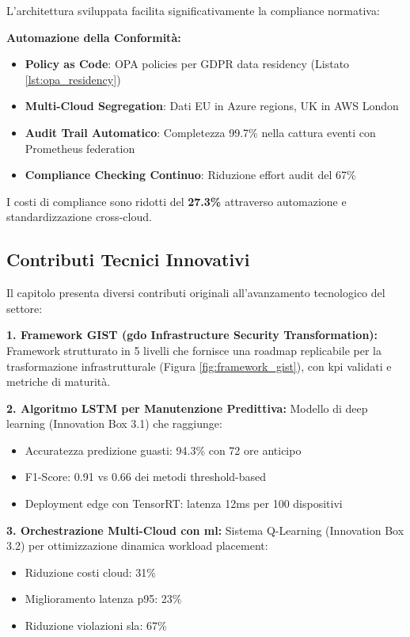 L'architettura sviluppata facilita significativamente la compliance normativa:

\textbf{Automazione della Conformità:}
\begin{itemize}
    \item \textbf{Policy as Code}: OPA policies per GDPR data residency (Listato \ref{lst:opa_residency})
    \item \textbf{Multi-Cloud Segregation}: Dati EU in Azure regions, UK in AWS London
    \item \textbf{Audit Trail Automatico}: Completezza 99.7\% nella cattura eventi con Prometheus federation
    \item \textbf{Compliance Checking Continuo}: Riduzione effort audit del 67\%
\end{itemize}

I costi di compliance sono ridotti del \textbf{27.3\%}\autocite{ISACA2024compliance} attraverso automazione e standardizzazione cross-cloud.

\subsection{\texorpdfstring{Contributi Tecnici Innovativi}{3.8.4 - Contributi Tecnici Innovativi}}

Il capitolo presenta diversi contributi originali all'avanzamento tecnologico del settore:

\textbf{1. Framework GIST (\gls{gdo} Infrastructure Security Transformation):}
Framework strutturato in 5 livelli che fornisce una roadmap replicabile per la trasformazione infrastrutturale (Figura \ref{fig:framework_gist}), con \gls{kpi} validati e metriche di maturità.

\textbf{2. Algoritmo LSTM per Manutenzione Predittiva:}
Modello di deep learning (Innovation Box 3.1) che raggiunge:
\begin{itemize}
    \item Accuratezza predizione guasti: 94.3\% con 72 ore anticipo
    \item F1-Score: 0.91 vs 0.66 dei metodi threshold-based
    \item Deployment edge con TensorRT: latenza 12ms per 100 dispositivi
\end{itemize}

\textbf{3. Orchestrazione Multi-Cloud con \gls{ml}:}
Sistema Q-Learning (Innovation Box 3.2) per ottimizzazione dinamica workload placement:
\begin{itemize}
    \item Riduzione costi cloud: 31\%
    \item Miglioramento latenza p95: 23\%
    \item Riduzione violazioni \gls{sla}: 67\%
\end{itemize}

